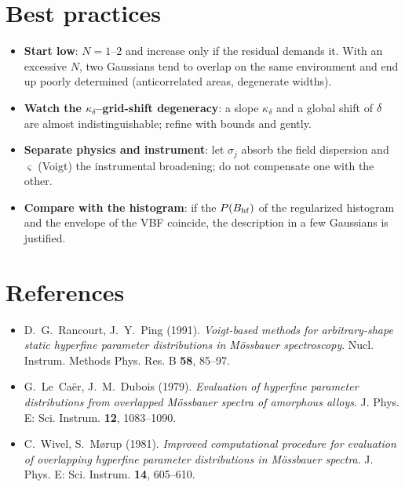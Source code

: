 \section{Best practices}
\label{sec:vbf-practica}

\begin{itemize}[nosep]
  \item \textbf{Start low}: $N=1$--$2$ and increase only if the residual demands
        it. With an excessive $N$, two Gaussians tend to overlap on the same
        environment and end up poorly determined (anticorrelated areas, degenerate
        widths).
  \item \textbf{Watch the $\kappa_\delta$--grid-shift degeneracy}: a slope
        $\kappa_\delta$ and a global shift of $\delta$ are almost indistinguishable;
        refine with bounds and gently.
  \item \textbf{Separate physics and instrument}: let $\sigma_j$ absorb the field
        dispersion and $\varsigma$ (Voigt) the instrumental broadening; do not
        compensate one with the other.
  \item \textbf{Compare with the histogram}: if the $P(B_{\mathrm{hf}})$ of the regularized
        histogram and the envelope of the VBF coincide, the description in a few
        Gaussians is justified.
\end{itemize}

\section*{References}
\begin{itemize}[nosep]
  \item D.~G.~Rancourt, J.~Y.~Ping (1991). \emph{Voigt-based methods for
        arbitrary-shape static hyperfine parameter distributions in Mössbauer
        spectroscopy}. Nucl. Instrum. Methods Phys. Res. B \textbf{58}, 85--97.
  \item G.~Le~Caër, J.~M.~Dubois (1979). \emph{Evaluation of hyperfine parameter
        distributions from overlapped Mössbauer spectra of amorphous alloys}.
        J. Phys. E: Sci. Instrum. \textbf{12}, 1083--1090.
  \item C.~Wivel, S.~M\o{}rup (1981). \emph{Improved computational procedure for
        evaluation of overlapping hyperfine parameter distributions in Mössbauer
        spectra}. J. Phys. E: Sci. Instrum. \textbf{14}, 605--610.
\end{itemize}
